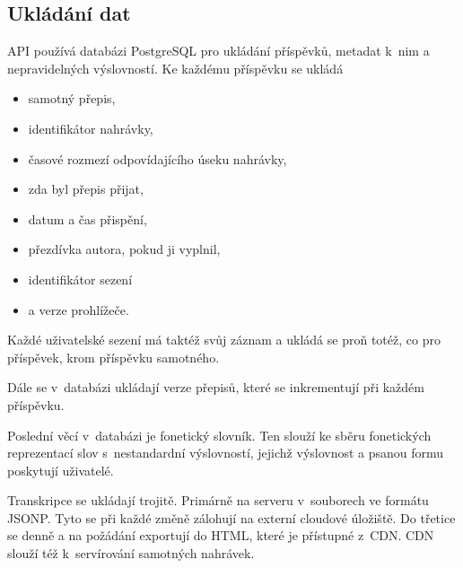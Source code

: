 \subsection{Ukládání dat}

API používá databázi PostgreSQL pro ukládání příspěvků, metadat k~nim a nepravidelných
výslovností. Ke každému příspěvku se ukládá
\begin{itemize}
\item{samotný přepis,}
\item{identifikátor nahrávky,}
\item{časové rozmezí odpovídajícího úseku nahrávky,}
\item{zda byl přepis přijat,}
\item{datum a čas přispění,}
\item{přezdívka autora, pokud ji vyplnil,}
\item{identifikátor sezení}
\item{a verze prohlížeče.}
\end{itemize}

Každé uživatelské sezení má taktéž svůj záznam a ukládá se proň totéž, co pro
příspěvek, krom příspěvku samotného.

Dále se v~databázi ukládají verze přepisů, které se inkrementují při každém
příspěvku.

Poslední věcí v~databázi je fonetický slovník. Ten slouží ke sběru fonetických
reprezentací slov s~nestandardní výslovností, jejichž výslovnost a psanou formu
poskytují uživatelé.

Transkripce se ukládají trojitě. Primárně na serveru v~souborech ve formátu JSONP.
Tyto se při každé změně zálohují na externí cloudové úložiště. Do třetice se
denně a na požádání exportují do HTML, které je přístupné z~CDN.
CDN slouží též k~servírování samotných nahrávek.

